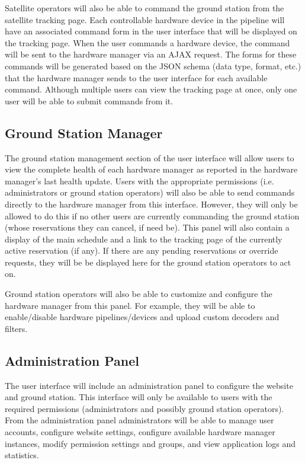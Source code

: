 \documentclass{mxl-design}
\begin{document}
Satellite operators will also be able to command the ground station from the satellite tracking page. Each controllable hardware device in the pipeline will have an associated command form in the user interface that will be displayed on the tracking page. When the user commands a hardware device, the command will be sent to the hardware manager via an AJAX request. The forms for these commands will be generated based on the JSON schema (data type, format, etc.) that the hardware manager sends to the user interface for each available command. Although multiple users can view the tracking page at once, only one user will be able to submit commands from it.

\subsection{Ground Station Manager}
\label{sec:ground_station_manager}
The ground station management section of the user interface will allow users to view the complete health of each hardware manager as reported in the hardware manager's last health update. Users with the appropriate permissions (i.e. administrators or ground station operators) will also be able to send commands directly to the hardware manager from this interface. However, they will only be allowed to do this if no other users are currently commanding the ground station (whose reservations they can cancel, if need be). This panel will also contain a display of the main schedule and a link to the tracking page of the currently active reservation (if any). If there are any pending reservations or override requests, they will be be displayed here for the ground station operators to act on.

Ground station operators will also be able to customize and configure the hardware manager from this panel. For example, they will be able to enable/disable hardware pipelines/devices and upload custom decoders and filters.

\subsection{Administration Panel}
\label{sec:admin_panel}
The user interface will include an administration panel to configure the website and ground station. This interface will only be available to users with the required permissions (administrators and possibly ground station operators). From the administration panel administrators will be able to manage user accounts, configure website settings, configure available hardware manager instances, modify permission settings and groups, and view application logs and statistics.
\end{document}
